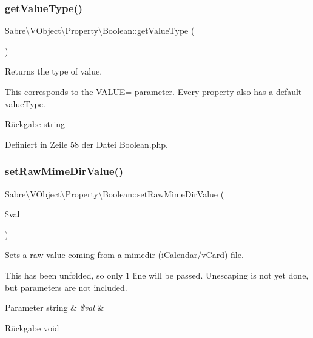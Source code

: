 \subsubsection{\texorpdfstring{get\+Value\+Type()}{getValueType()}}
{\footnotesize\ttfamily Sabre\textbackslash{}\+V\+Object\textbackslash{}\+Property\textbackslash{}\+Boolean\+::get\+Value\+Type (\begin{DoxyParamCaption}{ }\end{DoxyParamCaption})}

Returns the type of value.

This corresponds to the V\+A\+L\+UE= parameter. Every property also has a \textquotesingle{}default\textquotesingle{} value\+Type.

\begin{DoxyReturn}{Rückgabe}
string 
\end{DoxyReturn}


Definiert in Zeile 58 der Datei Boolean.\+php.

\mbox{\label{class_sabre_1_1_v_object_1_1_property_1_1_boolean_a4a7d20201310e3ab1d3be1f33d3ba97a}} 
\subsubsection{\texorpdfstring{set\+Raw\+Mime\+Dir\+Value()}{setRawMimeDirValue()}}
{\footnotesize\ttfamily Sabre\textbackslash{}\+V\+Object\textbackslash{}\+Property\textbackslash{}\+Boolean\+::set\+Raw\+Mime\+Dir\+Value (\begin{DoxyParamCaption}\item[{}]{\$val }\end{DoxyParamCaption})}

Sets a raw value coming from a mimedir (i\+Calendar/v\+Card) file.

This has been \textquotesingle{}unfolded\textquotesingle{}, so only 1 line will be passed. Unescaping is not yet done, but parameters are not included.


\begin{DoxyParams}[1]{Parameter}
string & {\em \$val} & \\
\hline
\end{DoxyParams}
\begin{DoxyReturn}{Rückgabe}
void 
\end{DoxyReturn}


